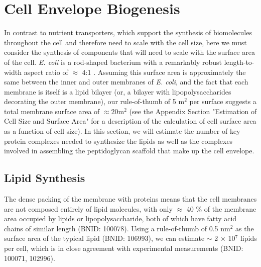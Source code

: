 \section{Cell Envelope Biogenesis}
In contrast to nutrient transporters, which support the synthesis of
biomolecules throughout the cell and therefore need to scale with the cell
size, here we must consider the synthesis of components that will need to
scale with the surface area of the cell. \textit{E. coli} is a rod-shaped
bacterium with a remarkably robust length-to-width aspect ratio of $\approx$
4:1 \citep{harris2018, ojkic2019}. Assuming this surface area is
approximately the same between the inner and outer membranes of \textit{E.
coli}, and the fact that each membrane is itself is a lipid bilayer (or, a
bilayer with lipopolysaccharides decorating the outer membrane), our rule-of-thumb
of 5 \textmu m$^2$ per surface suggests a total membrane surface area of
$\approx 20  $\textmu m$^2$ (see the Appendix Section "Estimation of Cell Size and Surface Area" for a description of the calculation of cell
surface area as a function of cell size). In this section, we will estimate
the number of key protein complexes needed to synthesize the lipids as well
as the complexes involved in assembling the peptidoglycan scaffold that make
up the cell envelope.

\subsection{Lipid Synthesis}
The dense packing of the membrane with proteins means that the cell membranes
are not composed entirely of lipid molecules, with only $\approx$ 40 \% of the
membrane area occupied by lipids or lipopolysaccharide, both of which have fatty
acid chains of similar length (BNID: 100078). Using a rule-of-thumb of 0.5
nm$^2$ as the surface area of the typical lipid (BNID: 106993), we can
estimate $\sim$ 2 $\times$ 10$^7$ lipids per cell, which is in close
agreement with experimental measurements (BNID: 100071, 102996).


